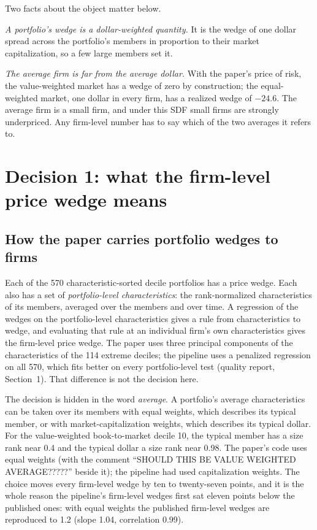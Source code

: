 \documentclass[11pt]{article}
\begin{document}
Two facts about the object matter below.

\emph{A portfolio's wedge is a dollar-weighted quantity.} It is the wedge of
one dollar spread across the portfolio's members in proportion to their
market capitalization, so a few large members set it.

\emph{The average firm is far from the average dollar.} With the paper's
price of risk, the value-weighted market has a wedge of zero by
construction; the equal-weighted market, one dollar in every firm, has a
realized wedge of $-24.6$\pp. The average firm is a small firm, and under
this SDF small firms are strongly underpriced. Any firm-level number has to
say which of the two averages it refers to.

\section{Decision 1: what the firm-level price wedge means}

\subsection*{How the paper carries portfolio wedges to firms}

Each of the 570 characteristic-sorted decile portfolios has a price wedge.
Each also has a set of \emph{portfolio-level characteristics}: the
rank-normalized characteristics of its members, averaged over the members
and over time. A regression of the wedges on the portfolio-level
characteristics gives a rule from characteristics to wedge, and evaluating
that rule at an individual firm's own characteristics gives the firm-level
price wedge. The paper uses three principal components of the
characteristics of the 114 extreme deciles; the pipeline uses a penalized
regression on all 570, which fits better on every portfolio-level test
(quality report, Section~1). That difference is not the decision here.

The decision is hidden in the word \emph{average}. A portfolio's average
characteristics can be taken over its members with equal weights, which
describes its typical member, or with market-capitalization weights, which
describes its typical dollar. For the value-weighted book-to-market decile
10, the typical member has a size rank near 0.4 and the typical dollar a
size rank near 0.98. The paper's code uses equal weights (with the comment
``SHOULD THIS BE VALUE WEIGHTED AVERAGE?????'' beside it); the pipeline had
used capitalization weights. The choice moves every firm-level wedge by ten
to twenty-seven points, and it is the whole reason the pipeline's firm-level
wedges first sat eleven points below the published ones: with equal weights
the published firm-level wedges are reproduced to 1.2\pp{} (slope 1.04,
correlation 0.99).
\end{document}
